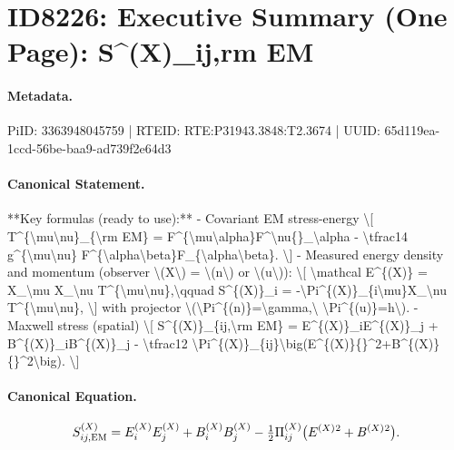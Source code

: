 \section*{ID8226: Executive Summary (One Page): S\textasciicircum{}(X)\_ij,rm EM}
\paragraph{Metadata.}
PiID: 3363948045759 | RTEID: RTE:P31943.3848:T2.3674 | UUID: 65d119ea-1ccd-56be-baa9-ad739f2e64d3

\paragraph{Canonical Statement.}
**Key formulas (ready to use):** - Covariant EM stress-energy \textbackslash{}[ T\textasciicircum{}\{\textbackslash{}mu\textbackslash{}nu\}\_\{\textbackslash{}rm EM\} = F\textasciicircum{}\{\textbackslash{}mu\textbackslash{}alpha\}F\textasciicircum{}\textbackslash{}nu\{\}\_\textbackslash{}alpha - \textbackslash{}tfrac14 g\textasciicircum{}\{\textbackslash{}mu\textbackslash{}nu\} F\textasciicircum{}\{\textbackslash{}alpha\textbackslash{}beta\}F\_\{\textbackslash{}alpha\textbackslash{}beta\}. \textbackslash{}] - Measured energy density and momentum (observer \textbackslash{}(X\textbackslash{}) = \textbackslash{}(n\textbackslash{}) or \textbackslash{}(u\textbackslash{})): \textbackslash{}[ \textbackslash{}mathcal E\textasciicircum{}\{(X)\} = X\_\textbackslash{}mu X\_\textbackslash{}nu T\textasciicircum{}\{\textbackslash{}mu\textbackslash{}nu\},\textbackslash{}qquad S\textasciicircum{}\{(X)\}\_i = -\textbackslash{}Pi\textasciicircum{}\{(X)\}\_\{i\textbackslash{}mu\}X\_\textbackslash{}nu T\textasciicircum{}\{\textbackslash{}mu\textbackslash{}nu\}, \textbackslash{}] with projector \textbackslash{}(\textbackslash{}Pi\textasciicircum{}\{(n)\}=\textbackslash{}gamma,\textbackslash{} \textbackslash{}Pi\textasciicircum{}\{(u)\}=h\textbackslash{}). - Maxwell stress (spatial) \textbackslash{}[ S\textasciicircum{}\{(X)\}\_\{ij,\textbackslash{}rm EM\} = E\textasciicircum{}\{(X)\}\_iE\textasciicircum{}\{(X)\}\_j + B\textasciicircum{}\{(X)\}\_iB\textasciicircum{}\{(X)\}\_j - \textbackslash{}tfrac12 \textbackslash{}Pi\textasciicircum{}\{(X)\}\_\{ij\}\textbackslash{}big(E\textasciicircum{}\{(X)\}\{\}\textasciicircum{}2+B\textasciicircum{}\{(X)\}\{\}\textasciicircum{}2\textbackslash{}big). \textbackslash{}]

\paragraph{Canonical Equation.}
\[
S^{(X)}_{ij,\rm EM} = E^{(X)}_iE^{(X)}_j + B^{(X)}_iB^{(X)}_j - \tfrac12 \Pi^{(X)}_{ij}\big(E^{(X)}{}^2+B^{(X)}{}^2\big).
\]

